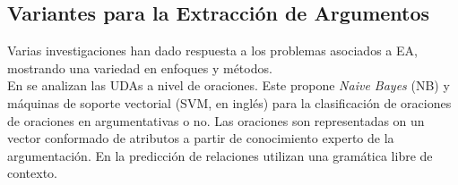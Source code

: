 \documentclass[a4paper,11pt,twocolumn,twoside]{article}
\begin{document}




\subsection{Variantes para la Extracción de Argumentos} %

Varias investigaciones han dado respuesta a los problemas asociados a EA, mostrando
una variedad en enfoques y métodos.\\

En \cite{palau2009argumentation} se analizan las UDAs a nivel de oraciones.
Este propone \textit{Naive Bayes} (NB) y máquinas de soporte vectorial (SVM, en inglés) para la clasificación
de oraciones de oraciones en argumentativas o no. Las oraciones son representadas
on un vector conformado de atributos a partir de conocimiento experto de la argumentación. En
la predicción de relaciones utilizan una gramática libre de contexto.

\end{document}

